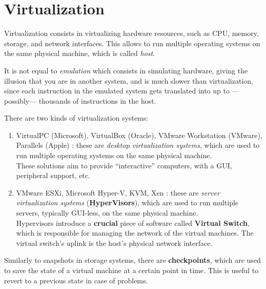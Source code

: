 \chapter{Virtualization}

Virtualization consists in virtualizing hardware resources, such as CPU, memory, storage, and network interfaces. This allows to run multiple operating systems on the same physical machine, which is called \textit{host}.

It is not equal to \textit{emulation} which consists in simulating hardware, giving the illusion that you are in another system, and is much slower than virtualization, since each instruction in the emulated system gets translated into up to ---possibly--- thousands  of instructions in the host.


There are two kinds of virtualization systems:
\begin{enumerate}
   \item VirtualPC (Microsoft), VirtualBox (Oracle), VMware Workstation (VMware), Parallels (Apple) : these are \textit{desktop virtualization systems}, which are used to run multiple operating systems on the same physical machine.\\
   These solutions aim to provide ``interactive'' computers, with a GUI, peripheral support, etc. 
   \item VMware ESXi, Microsoft Hyper-V, KVM, Xen : these are \textit{server virtualization systems} (\textbf{HyperVisors}), which are used to run multiple servers, typically GUI-less, on the same physical machine.\\
   Hypervisors introduce a \textbf{crucial} piece of software called \textbf{Virtual Switch}, which is responsible for managing the network of the virtual machines.
   The virtual switch's uplink is the host's physical network interface.
\end{enumerate}
Similarly to snapshots in storage systems, there are \textbf{checkpoints}, which are used to save the state of a virtual machine at a certain point in time. This is useful to revert to a previous state in case of problems.

